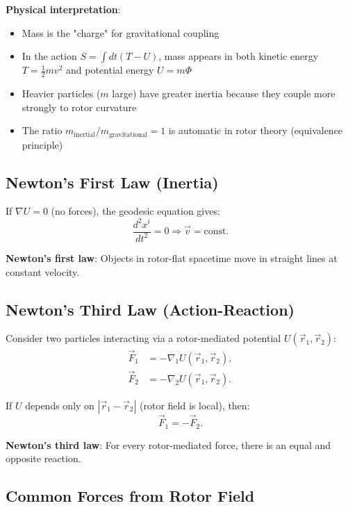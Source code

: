 \documentclass[12pt,a4paper]{article}
\theoremstyle{definition}
\theoremstyle{remark}
\begin{document}
\textbf{Physical interpretation}:
\begin{itemize}
\item Mass is the "charge" for gravitational coupling
\item In the action $S = \int dt (T - U)$, mass appears in both kinetic energy $T = \frac{1}{2}mv^2$ and potential energy $U = m\Phi$
\item Heavier particles ($m$ large) have greater inertia because they couple more strongly to rotor curvature
\item The ratio $m_{\text{inertial}}/m_{\text{gravitational}} = 1$ is automatic in rotor theory (equivalence principle)
\end{itemize}

\subsection{Newton's First Law (Inertia)}

If $\nabla U = 0$ (no forces), the geodesic equation gives:
\begin{equation}
\frac{d^2 x^i}{dt^2} = 0 \Rightarrow \vec{v} = \text{const}.
\end{equation}

\textbf{Newton's first law}: Objects in rotor-flat spacetime move in straight lines at constant velocity.

\subsection{Newton's Third Law (Action-Reaction)}

Consider two particles interacting via a rotor-mediated potential $U(\vec{r}_1, \vec{r}_2)$:
\begin{align}
\vec{F}_1 &= -\nabla_1 U(\vec{r}_1, \vec{r}_2), \\
\vec{F}_2 &= -\nabla_2 U(\vec{r}_1, \vec{r}_2).
\end{align}

If $U$ depends only on $|\vec{r}_1 - \vec{r}_2|$ (rotor field is local), then:
\begin{equation}
\vec{F}_1 = -\vec{F}_2.
\end{equation}

\textbf{Newton's third law}: For every rotor-mediated force, there is an equal and opposite reaction.

\subsection{Common Forces from Rotor Field}
\end{document}
